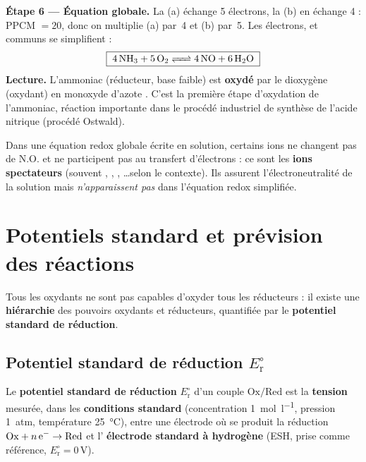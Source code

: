 \documentclass[11pt,a4paper]{article}
\newcommand{\NO}{\ensuremath{\mathrm{N.O.}}}    %
\begin{document}
\begin{exemple}[équilibrage en milieu basique : \ce{NH3 + O2 <=> NO + H2O}]
\textbf{Étape 6 — Équation globale.} La (a) échange 5 électrons, la (b) en échange 4 : PPCM $=20$,
donc on multiplie (a) par~4 et (b) par~5. Les électrons,  et  communs se
simplifient :
\[
\boxed{\;\ce{4 NH3 + 5 O2 <=> 4 NO + 6 H2O}\;}
\]
\textbf{Lecture.} L'ammoniac  (réducteur, base faible) est \textbf{oxydé} par le dioxygène
 (oxydant) en monoxyde d'azote . C'est la première étape d'oxydation de l'ammoniac,
réaction importante dans le procédé industriel de synthèse de l'acide nitrique (procédé Ostwald).
\end{exemple}

\begin{remarque}
Dans une équation redox globale écrite en solution, certains ions ne changent pas de $\NO$ et ne
participent pas au transfert d'électrons : ce sont les \textbf{ions spectateurs} (souvent
, , , \ldots selon le contexte). Ils assurent l'électroneutralité
de la solution mais \emph{n'apparaissent pas} dans l'équation redox simplifiée.
\end{remarque}

\section{Potentiels standard et prévision des réactions}

Tous les oxydants ne sont pas capables d'oxyder tous les réducteurs : il existe une
\textbf{hiérarchie} des pouvoirs oxydants et réducteurs, quantifiée par le \textbf{potentiel
standard de réduction}.

\subsection{Potentiel standard de réduction $E_{\mathrm{r}}^{\circ}$}

\begin{definition}
Le \textbf{potentiel standard de réduction} $E_{\mathrm{r}}^{\circ}$ d'un couple
$\mathrm{Ox}/\mathrm{Red}$ est la \textbf{tension} mesurée, dans les \textbf{conditions standard}
(concentration \SI{1}{mol\per\litre}, pression \SI{1}{atm}, température \SI{25}{\celsius}), entre
une électrode où se produit la réduction $\mathrm{Ox}+n\,\ce{e^-}\to\mathrm{Red}$ et l'
\textbf{électrode standard à hydrogène} (ESH, prise comme référence, $E_{\mathrm{r}}^{\circ}=0$\,V).
\end{definition}
\end{document}
